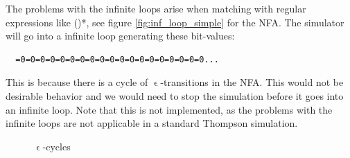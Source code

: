 The problems with the infinite loops arise when matching with regular
expressions like \textsf{()*}, see figure \vref{fig:inf_loop_simple}
for the NFA. The simulator will go into a infinite loop generating
these bit-values:
\begin{verbatim}
  =0=0=0=0=0=0=0=0=0=0=0=0=0=0=0=0=0=0=0...
\end{verbatim}
This is because there is a cycle of $\upvarepsilon$-transitions in the
NFA. This would not be desirable behavior and we would need to stop
the simulation before it goes into an infinite loop. Note that this is
not implemented, as the problems with the infinite loops are not
applicable in a standard Thompson simulation.

\begin{figure}
  \centering {}
\caption{$\upvarepsilon$-cycles}
\label{fig:inf_loop}
\end{figure}


